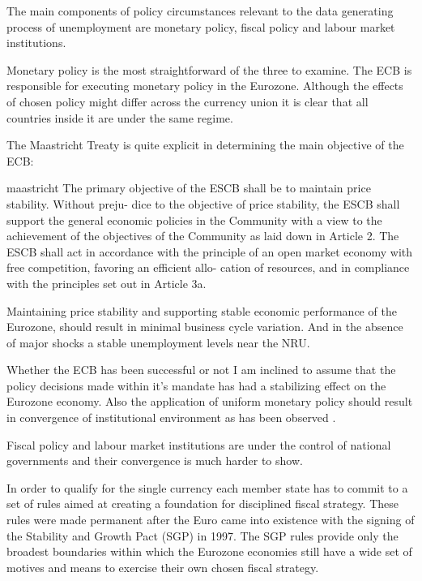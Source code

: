 \documentclass[12pt,a4paper,english]{article}
\begin{document}
The main components of policy circumstances relevant to the data generating process of unemployment are monetary policy, fiscal policy and labour market institutions. 

Monetary policy is the most straightforward of the three to examine. The ECB is responsible for executing monetary policy in the Eurozone. Although the effects of chosen policy might differ across the currency union it is clear that all countries inside it are under the same regime. 

The Maastricht Treaty is quite explicit in determining the main objective of the ECB:

\begin{displaycquote}{maastricht}
The primary objective of the ESCB shall be
to  maintain  price  stability.  Without  preju-
dice to the objective of price stability, the
ESCB  shall  support  the  general  economic
policies in the Community with a view to
the  achievement  of  the  objectives  of  the
Community as laid down in Article 2. The
ESCB  shall  act  in  accordance  with  the
principle of an open market economy with
free competition, favoring an efficient allo-
cation  of  resources,  and  in  compliance
with  the  principles  set  out  in  Article  3a.
\end{displaycquote}

Maintaining price stability and supporting stable economic performance of the Eurozone, should result in minimal business cycle variation. And in the absence of major shocks a stable unemployment levels near the NRU.

Whether the ECB has been successful or not I am inclined to assume that the policy decisions made within it's mandate has had a stabilizing effect on the Eurozone economy. Also the application of uniform monetary policy should result in convergence of institutional environment as has been observed \citep{agresti2001}. 

Fiscal policy and labour market institutions are under the control of national governments and their convergence is much harder to show.

In order to qualify for the single currency each member state has to commit to a set of rules aimed at creating a foundation for disciplined fiscal strategy. These rules were made permanent after the Euro came into existence with the signing of the Stability and Growth Pact (SGP) in 1997. The SGP rules provide only the broadest boundaries within which the Eurozone economies still have a wide set of motives and means to exercise their own chosen fiscal strategy. \citep{iversen2016}
\end{document}
